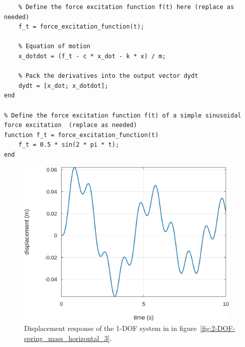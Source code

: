 \documentclass[12pt,letter]{article}
\begin{document}
\begin{example}
\begin{lstlisting}
	% Define the force excitation function f(t) here (replace as needed)
	f_t = force_excitation_function(t);
	
	% Equation of motion
	x_dotdot = (f_t - c * x_dot - k * x) / m;
	
	% Pack the derivatives into the output vector dydt
	dydt = [x_dot; x_dotdot];
end

% Define the force excitation function f(t) of a simple sinusoidal force excitation  (replace as needed)
function f_t = force_excitation_function(t)
	f_t = 0.5 * sin(2 * pi * t);
end
\end{lstlisting}


			\begin{figure}[H]
				\centering
				\includegraphics[width=4.25in]{../figures/ODE_results-1-DOF}
				\caption{Displacement response of the 1-DOF system in in figure~\ref{fig:2-DOF-spring_mass_horizontal_3}.}
				\label{fig:ODE_results}
			\end{figure}				



	
	\end{example}
	

	
\end{document}
